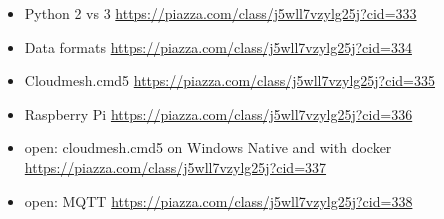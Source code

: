\begin{itemize}
\tightlist
\item
  Python 2 vs 3 \url{https://piazza.com/class/j5wll7vzylg25j?cid=333}
\item
  Data formats \url{https://piazza.com/class/j5wll7vzylg25j?cid=334}
\item
  Cloudmesh.cmd5 \url{https://piazza.com/class/j5wll7vzylg25j?cid=335}
\item
  Raspberry Pi \url{https://piazza.com/class/j5wll7vzylg25j?cid=336}
\item
  open: cloudmesh.cmd5 on Windows Native and with docker
  \url{https://piazza.com/class/j5wll7vzylg25j?cid=337}
\item
  open: MQTT \url{https://piazza.com/class/j5wll7vzylg25j?cid=338}
    
\end{itemize}
